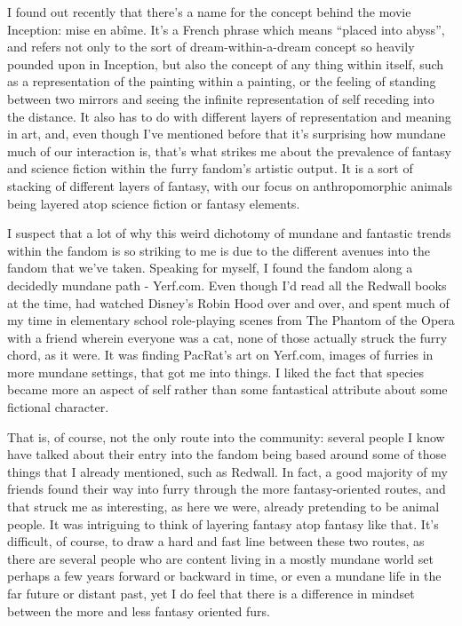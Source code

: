 
I found out recently that there's a name for the concept behind the movie Inception: mise en abîme. It's a French phrase which means ``placed into abyss'', and refers not only to the sort of dream-within-a-dream concept so heavily pounded upon in Inception, but also the concept of any thing within itself, such as a representation of the painting within a painting, or the feeling of standing between two mirrors and seeing the infinite representation of self receding into the distance. It also has to do with different layers of representation and meaning in art, and, even though I've mentioned before that it's surprising how mundane much of our interaction is, that's what strikes me about the prevalence of fantasy and science fiction within the furry fandom's artistic output. It is a sort of stacking of different layers of fantasy, with our focus on anthropomorphic animals being layered atop science fiction or fantasy elements.

I suspect that a lot of why this weird dichotomy of mundane and fantastic trends within the fandom is so striking to me is due to the different avenues into the fandom that we've taken. Speaking for myself, I found the fandom along a decidedly mundane path - Yerf.com. Even though I'd read all the Redwall books at the time, had watched Disney's Robin Hood over and over, and spent much of my time in elementary school role-playing scenes from The Phantom of the Opera with a friend wherein everyone was a cat, none of those actually struck the furry chord, as it were. It was finding PacRat's art on Yerf.com, images of furries in more mundane settings, that got me into things. I liked the fact that species became more an aspect of self rather than some fantastical attribute about some fictional character.

That is, of course, not the only route into the community: several people I know have talked about their entry into the fandom being based around some of those things that I already mentioned, such as Redwall. In fact, a good majority of my friends found their way into furry through the more fantasy-oriented routes, and that struck me as interesting, as here we were, already pretending to be animal people. It was intriguing to think of layering fantasy atop fantasy like that. It's difficult, of course, to draw a hard and fast line between these two routes, as there are several people who are content living in a mostly mundane world set perhaps a few years forward or backward in time, or even a mundane life in the far future or distant past, yet I do feel that there is a difference in mindset between the more and less fantasy oriented furs.

